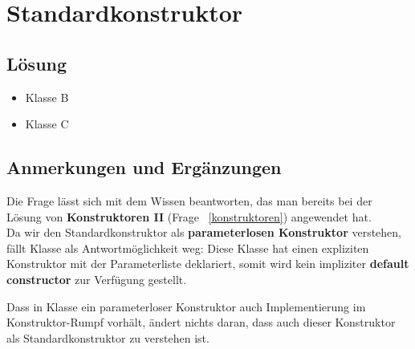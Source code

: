 \chapter{Standardkonstruktor}

\section*{Lösung}

\begin{itemize}
    \item Klasse B
    \item Klasse C
\end{itemize}


\section*{Anmerkungen und Ergänzungen}

Die Frage lässt sich mit dem Wissen beantworten, das man bereits bei der Lösung von \textbf{Konstruktoren II} (Frage ~\ref{konstruktoren}) angewendet hat.\\

Da wir den Standardkonstruktor als \textbf{parameterlosen Konstruktor} verstehen, fällt Klasse  als
Antwortmöglichkeit weg: Diese Klasse hat einen expliziten Konstruktor mit der Parameterliste  deklariert,
somit wird kein impliziter \textbf{default constructor} zur Verfügung gestellt.

Dass in Klasse  ein parameterloser Konstruktor auch Implementierung im Konstruktor-Rumpf vorhält, ändert nichts daran,
dass auch dieser Konstruktor als Standardkonstruktor zu verstehen ist.